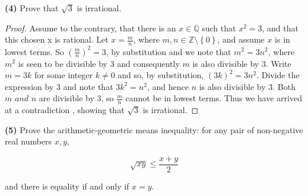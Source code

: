 \documentclass[12pt]{article}
\newcommand{\set}[1]{\left\{ {#1} \right\}}
\begin{document}
\newpage

\noindent \textbf{(4)} Prove that $\sqrt{3}$ is irrational.

\begin{proof}
Assume to the contrary, that there is an $x\in\mathbb{Q}$ such that $x^2=3$, and that this chosen x is rational. Let $x=\frac{m}{n}$, where $m,n\in\mathbb{Z}\setminus \set{0}$, and assume $x$ is in lowest terms. So $(\frac{m}{n})^2=3$, by substitution and we note that $m^2 = 3n^2$, where $m^2$ is seen to be divisible by 3 and consequently $m$ is also divisible by 3. Write $m=3k$ for some integer $k\neq0$ and so, by substitution, $(3k)^2=3n^2$. Divide the expression by 3 and note that $3k^2=n^2$, and hence $n$ is also divisible by 3. Both $m \textit{ and } n$ are divisible by 3, so $\frac{m}{n}$ cannot be in lowest terms. Thus we have arrived at a contradiction , showing that $\sqrt{3}$ is irrational.
\end{proof}

\newpage

\noindent \textbf{(5)} Prove the arithmetic-geometric means inequality: for any pair of non-negative real numbers $x, y$,

\begin{equation*}
	\sqrt{xy} \le \frac{x+y}{2}
\end{equation*}

\noindent and there is equality if and only if $x=y$.
\end{document}
